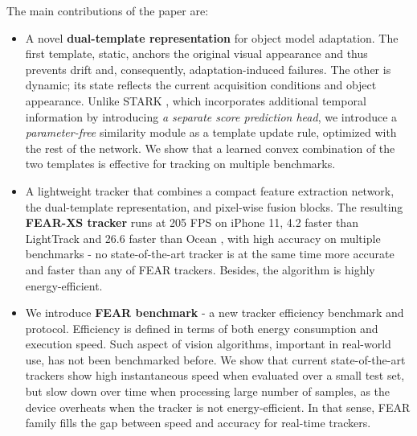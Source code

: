 \documentclass[runningheads]{llncs}
\begin{document}
The main contributions of the paper are:
\begin{itemize}


\item  A novel \textbf{dual-template representation} for object model adaptation.
The first template, static, anchors the original visual appearance
and thus prevents drift and, consequently, adaptation-induced failures.
The other is dynamic; its state reflects the current acquisition conditions and object appearance. 
Unlike STARK \cite{STARK}, which incorporates additional temporal information by introducing \textit{a separate score prediction head}, we introduce a \textit{parameter-free} similarity module as a template update rule, optimized with the rest of the network.
We show that a learned convex combination of the two templates is effective for tracking on multiple benchmarks.





\item  A lightweight tracker that combines a compact feature extraction network, the dual-template representation, and pixel-wise fusion blocks.
The resulting {\bf FEAR-XS tracker} runs at 205 FPS on iPhone 11, 4.2 faster than LightTrack \cite{LightTrack} and 26.6 faster than Ocean \cite{Ocean}, with high accuracy on multiple benchmarks - no state-of-the-art tracker is at the same time more accurate and faster than any of FEAR trackers. Besides, the algorithm is highly energy-efficient.
    
    
\item We introduce \textbf{FEAR benchmark} - a new tracker efficiency benchmark and protocol. Efficiency is defined in terms of both energy consumption and execution speed.
Such aspect of vision algorithms, important in real-world use, has not been benchmarked before. 
We show that current state-of-the-art trackers show high instantaneous speed when evaluated over a small test set, but slow down over time when processing large number of samples, as the device overheats when the tracker is not energy-efficient.
In that sense, FEAR family fills the gap between speed and accuracy for real-time trackers.
\end{itemize}
\end{document}
